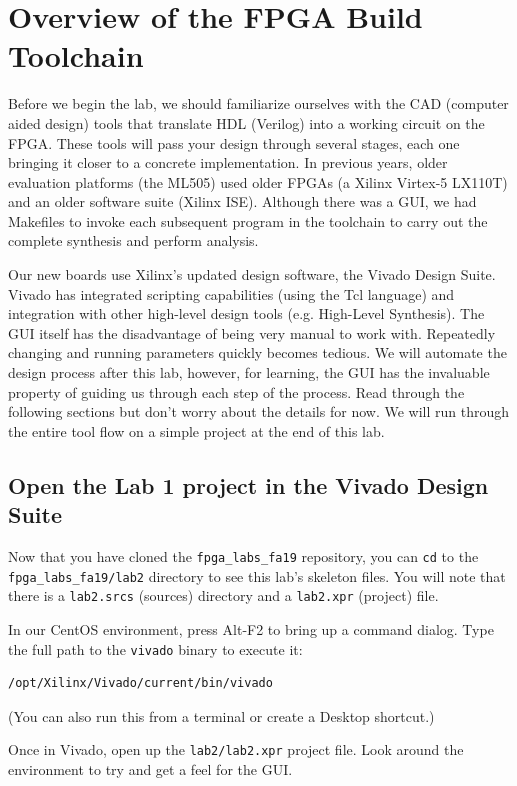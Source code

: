 \documentclass[11pt]{article}
\newcommand{\repo}{fpga\_labs\_fa19}
\begin{document}
\section{Overview of the FPGA Build Toolchain}
Before we begin the lab, we should familiarize ourselves with the CAD (computer aided design) tools that translate HDL (Verilog) into a working circuit on the FPGA.
These tools will pass your design through several stages, each one bringing it closer to a concrete implementation.
In previous years, older evaluation platforms (the ML505) used older FPGAs (a Xilinx Virtex-5 LX110T) and an older software suite (Xilinx ISE).
Although there was a GUI, we had Makefiles to invoke each subsequent program in the toolchain to carry out the complete synthesis and perform analysis.

Our new boards use Xilinx's updated design software, the Vivado Design Suite.
Vivado has integrated scripting capabilities (using the Tcl language) and integration with other high-level design tools (e.g. High-Level Synthesis).
The GUI itself has the disadvantage of being very manual to work with.
Repeatedly changing and running parameters quickly becomes tedious.
We will automate the design process after this lab, however, for learning, the GUI has the invaluable property of guiding us through each step of the process.
Read through the following sections but don't worry about the details for now.
We will run through the entire tool flow on a simple project at the end of this lab.

\subsection{Open the Lab 1 project in the Vivado Design Suite}
Now that you have cloned the \texttt{\repo} repository, you can \texttt{cd} to the \texttt{\repo/lab2} directory to see this lab's skeleton files.
You will note that there is a \verb|lab2.srcs| (sources) directory and a \verb|lab2.xpr| (project) file.

In our CentOS environment, press Alt-F2 to bring up a command dialog. Type the full path to the \texttt{vivado} binary to execute it:

\begin{verbatim}
/opt/Xilinx/Vivado/current/bin/vivado
\end{verbatim}

(You can also run this from a terminal or create a Desktop shortcut.)

Once in Vivado, open up the \texttt{lab2/lab2.xpr} project file. Look around the environment to try and get a feel for the GUI.
\end{document}
